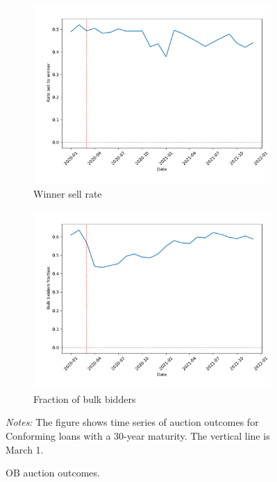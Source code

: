 \documentclass[11pt,a4paper]{article}
\begin{document}
\begin{figure}[h]
\begin{subfigure}[b]{0.49\textwidth}
      \includegraphics[width=0.998\textwidth]{../results/figures/dummy_sell_winner_mean_mat30_loan1_timeseries_nrmonthly_2.5_4_.pdf}
      \caption{ Winner sell rate}
      \end{subfigure}
     \begin{subfigure}[b]{0.49\textwidth}
      \includegraphics[width=0.998\textwidth]{../results/figures/bulk_bidders_fraction_mean_mat30_loan1_timeseries_nrmonthly_2.5_4_.pdf}
      \caption{ Fraction of bulk bidders}
     \end{subfigure}
     \caption{OB auction outcomes. } 
   \begin{minipage}{\textwidth}
      \footnotesize{\textit{Notes:} The figure shows time series of auction outcomes for Conforming loans with a 30-year maturity. The vertical line is March 1.  } 
      \end{minipage}
\end{figure}
\end{document}
